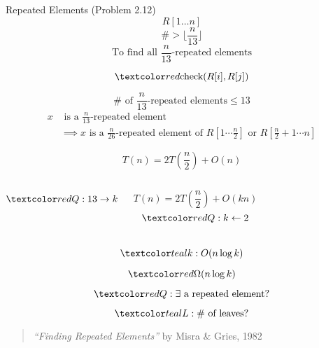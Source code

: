 
\begin{frame}{}
  \centerline{}
\end{frame}

\begin{frame}{}
  \begin{exampleblock}{Repeated Elements (Problem 2.12)}
    \[
      R[1 \dots n]
    \]
    \[
      \# > \lfloor \frac{n}{13} \rfloor
    \]
    \[
      \text{To find all $\frac{n}{13}$-repeated elements}
    \]

    \[
      \red{\text{check}(R[i], R[j])}
    \]
  \end{exampleblock}

  \pause
  \[
    \# \text{ of } \frac{n}{13}\text{-repeated elements} \le 13
  \]
  \pause
  \vspace{-0.50cm}
  \begin{align*}
    x &\text{ is a } \frac{n}{13}\text{-repeated element} \\
    &\implies x \text{ is a } \frac{n}{26}\text{-repeated element of } 
    R[1 \cdots \frac{n}{2}] \text{ or } R[\frac{n}{2}+1 \cdots n]
  \end{align*}
\end{frame}

\begin{frame}{}
  \centerline{}

  \pause
  \[
    T(n) = 2 T(\frac{n}{2}) + O(n)
  \]

  \begin{columns}
    \pause
      \[
	\red{Q: 13 \to k}
      \]

      \pause
      \[
	T(n) = 2T(\frac{n}{2}) + O(kn)
      \]
      \pause
      \[
	\red{Q: k \gets 2}
      \]

      \pause
  \end{columns}

  \pause
  \[
    \teal{k: O(n \log k)}
  \]
\end{frame}

\begin{frame}{}
  \[
    \red{\Omega(n \log k)}
  \]

  \pause
  \[
    \red{Q: \exists} \text{ a repeated element}?
  \]

  \pause
  \[
    \teal{L: \# \text{ of leaves} ?}
  \]

  \pause
  \vspace{0.60cm}
  \begin{quote}
    \centering
    {\it ``Finding Repeated Elements''} by Misra \& Gries, 1982
  \end{quote}
\end{frame}


